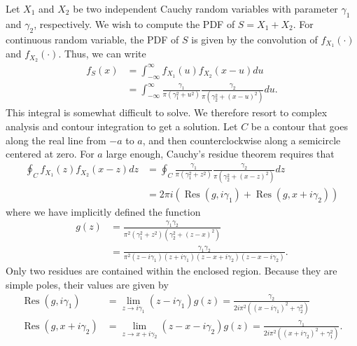Let $X_1$ and $X_2$ be two independent Cauchy random variables with parameter $\gamma_1$ and $\gamma_2$, respectively.
We wish to compute the PDF of $S = X_1 + X_2$.
For continuous random variable, the PDF of $S$ is given by the convolution of $f_{X_1} (\cdot)$ and $f_{X_2} (\cdot)$.
Thus, we can write
\begin{equation*}
\begin{split}
f_S (x) &= \int_{-\infty}^{\infty} f_{X_1} (u) f_{X_2} (x - u) du \\
 &= \int_{-\infty}^{\infty}
\frac{\gamma_1}{\pi \left( \gamma_1^2 + u^2 \right)}
\frac{\gamma_2}{\pi \left( \gamma_2^2 + (x - u)^2 \right)} du .
\end{split}
\end{equation*}
This integral is somewhat difficult to solve.
We therefore resort to complex analysis and contour integration to get a solution.
Let $C$ be a contour that goes along the real line from $-a$ to $a$, and then counterclockwise along a semicircle centered at zero.
For $a$ large enough, Cauchy's residue theorem requires that
\begin{equation} \label{equation:CauchyConvolutionContour}
\begin{split}
\oint_{C} f_{X_1} (z) f_{X_2} (x - z) dz
&= \oint_{C} 
\frac{\gamma_1}{\pi \left( \gamma_1^2 + z^2 \right)}
\frac{\gamma_2}{\pi \left( \gamma_2^2 + (x - z)^2 \right)} dz \\
&= 2 \pi i \left( \operatorname{Res} (g, i \gamma_1)
+ \operatorname{Res} (g, x + i \gamma_2) \right)
\end{split}
\end{equation}
where we have implicitly defined the function
\begin{equation*}
\begin{split}
g(z) &= \frac{\gamma_1 \gamma_2}{\pi^2 \left( \gamma_1^2 + z^2 \right)
\left( \gamma_2^2 + (z - x)^2 \right) } \\
&= \frac{\gamma_1 \gamma_2}{\pi^2
( z - i \gamma_1 ) ( z + i \gamma_1 )
( z - x + i \gamma_2 ) ( z - x - i \gamma_2 ) } .
\end{split}
\end{equation*}
Only two residues are contained within the enclosed region.
Because they are simple poles, their values are given by
\begin{align*}
\operatorname{Res} (g, i \gamma_1)
&= \lim_{z \rightarrow i \gamma_1} (z - i \gamma_1) g(z)
= \frac{\gamma_2}{2 i \pi^2
\left( ( x - i \gamma_1 )^2 + \gamma_2^2 \right) } \\
\operatorname{Res} (g, x + i \gamma_2)
&= \lim_{z \rightarrow x + i \gamma_2} (z - x - i \gamma_2) g(z)
= \frac{\gamma_1}{2 i \pi^2
\left( ( x + i \gamma_2 )^2 + \gamma_1^2 \right) } .
\end{align*}
